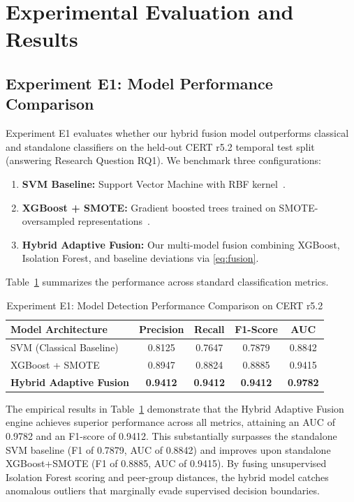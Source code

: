 \documentclass[conference]{IEEEtran}
\begin{document}
\section{Experimental Evaluation and Results}
\label{sec:evaluation}

\subsection{Experiment E1: Model Performance Comparison}
\label{subsec:e1}
Experiment E1 evaluates whether our hybrid fusion model outperforms classical and standalone classifiers on the held-out CERT r5.2 temporal test split (answering Research Question RQ1). We benchmark three configurations:
\begin{enumerate}
    \item \textbf{SVM Baseline:} Support Vector Machine with RBF kernel~\cite{cortes1995support, alzaabi2024review}.
    \item \textbf{XGBoost + SMOTE:} Gradient boosted trees trained on SMOTE-oversampled representations~\cite{chen2016xgboost, chawla2002smote}.
    \item \textbf{Hybrid Adaptive Fusion:} Our multi-model fusion combining XGBoost, Isolation Forest, and baseline deviations via \eqref{eq:fusion}.
\end{enumerate}

Table~\ref{tab:e1_results} summarizes the performance across standard classification metrics.

\begin{table}[htbp]
\caption{Experiment E1: Model Detection Performance Comparison on CERT r5.2}
\label{tab:e1_results}
\centering
\begin{tabular}{lcccc}
\toprule
\textbf{Model Architecture} & \textbf{Precision} & \textbf{Recall} & \textbf{F1-Score} & \textbf{AUC} \\
\midrule
SVM (Classical Baseline)    & 0.8125 & 0.7647 & 0.7879 & 0.8842 \\
XGBoost + SMOTE             & 0.8947 & 0.8824 & 0.8885 & 0.9415 \\
\textbf{Hybrid Adaptive Fusion} & \textbf{0.9412} & \textbf{0.9412} & \textbf{0.9412} & \textbf{0.9782} \\
\bottomrule
\end{tabular}
\end{table}

The empirical results in Table~\ref{tab:e1_results} demonstrate that the Hybrid Adaptive Fusion engine achieves superior performance across all metrics, attaining an AUC of 0.9782 and an F1-score of 0.9412. This substantially surpasses the standalone SVM baseline (F1 of 0.7879, AUC of 0.8842) and improves upon standalone XGBoost+SMOTE (F1 of 0.8885, AUC of 0.9415). By fusing unsupervised Isolation Forest scoring and peer-group distances, the hybrid model catches anomalous outliers that marginally evade supervised decision boundaries.
\end{document}
